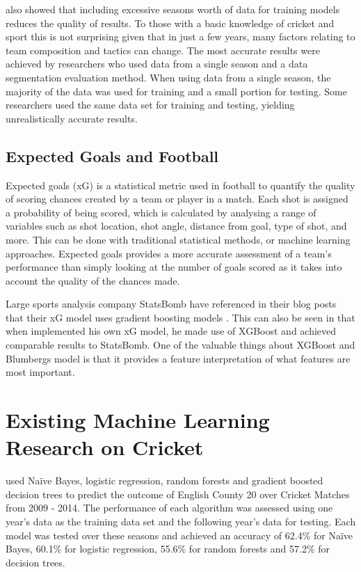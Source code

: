 \documentclass[12pt,a4paper]{report}
\theoremstyle{definition}
\begin{document}
\citet{horvat2020} also showed that including excessive seasons worth of data for training models reduces the quality of results. 
To those with a basic knowledge of cricket and sport this is not surprising given that in just a few years, many factors relating to team composition and tactics can change. 
The most accurate results were achieved by researchers who used data from a single season and a data segmentation evaluation method. 
When using data from a single season, the majority of the data was used for training and a small portion for testing. 
Some researchers used the same data set for training and testing, yielding unrealistically accurate results.

\subsection{Expected Goals and Football}

Expected goals (xG) is a statistical metric used in football to quantify the quality of scoring chances created by a team or player in a match. 
Each shot is assigned a probability of being scored, which is calculated by analysing a range of variables such as shot location, shot angle, distance from goal, type of shot, and more. 
This can be done with traditional statistical methods, or machine learning approaches.
Expected goals provides a more accurate assessment of a team's performance than simply looking at the number of goals scored as it takes into account the quality of the chances made.

Large sports analysis company StatsBomb have referenced in their blog posts that their xG model uses gradient boosting models \citep{statsbomb2022}. 
This can also be seen in that when \citet{Blumberg2020} implemented his own xG model, he made use of XGBoost \citep{Chen2016} and achieved comparable results to StatsBomb.
One of the valuable things about XGBoost and Blumbergs model is that it provides a feature interpretation of what features are most important.

\section{Existing Machine Learning Research on Cricket} \label{sec:CrickSurvey}

\citet{KampakisStylianos2015} used Naïve Bayes, logistic regression, random forests and gradient boosted decision trees to predict the outcome of English County 20 over Cricket Matches from 2009 - 2014. 
The performance of each algorithm was assessed using one year's data as the training data set and the following year's data for testing. 
Each model was tested over these seasons and achieved an accuracy of 62.4\% for Naïve Bayes, 60.1\% for logistic regression, 55.6\% for random forests and 57.2\% for decision trees.
\end{document}

